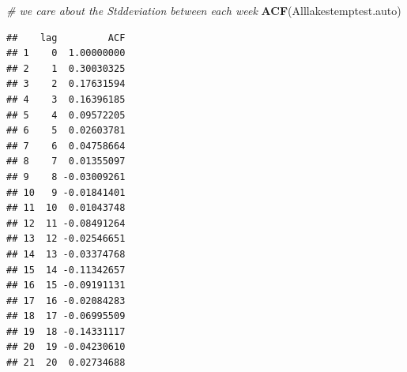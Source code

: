 \documentclass[12pt,]{article}
\newenvironment{Shaded}{\begin{snugshade}}{\end{snugshade}}
\newcommand{\KeywordTok}[1]{\textcolor[rgb]{0.13,0.29,0.53}{\textbf{#1}}}
\newcommand{\DataTypeTok}[1]{\textcolor[rgb]{0.13,0.29,0.53}{#1}}
\newcommand{\DecValTok}[1]{\textcolor[rgb]{0.00,0.00,0.81}{#1}}
\newcommand{\FloatTok}[1]{\textcolor[rgb]{0.00,0.00,0.81}{#1}}
\newcommand{\StringTok}[1]{\textcolor[rgb]{0.31,0.60,0.02}{#1}}
\newcommand{\CommentTok}[1]{\textcolor[rgb]{0.56,0.35,0.01}{\textit{#1}}}
\newcommand{\OperatorTok}[1]{\textcolor[rgb]{0.81,0.36,0.00}{\textbf{#1}}}
\newcommand{\NormalTok}[1]{#1}
\begin{document}
\begin{Shaded}
\begin{Highlighting}[]
\CommentTok{# we care about the Stddeviation between each week}
\KeywordTok{ACF}\NormalTok{(Alllakestemptest.auto)}
\end{Highlighting}
\end{Shaded}

\begin{verbatim}
##    lag         ACF
## 1    0  1.00000000
## 2    1  0.30030325
## 3    2  0.17631594
## 4    3  0.16396185
## 5    4  0.09572205
## 6    5  0.02603781
## 7    6  0.04758664
## 8    7  0.01355097
## 9    8 -0.03009261
## 10   9 -0.01841401
## 11  10  0.01043748
## 12  11 -0.08491264
## 13  12 -0.02546651
## 14  13 -0.03374768
## 15  14 -0.11342657
## 16  15 -0.09191131
## 17  16 -0.02084283
## 18  17 -0.06995509
## 19  18 -0.14331117
## 20  19 -0.04230610
## 21  20  0.02734688
\end{verbatim}

\begin{Shaded}
\end{Shaded}
\end{document}
